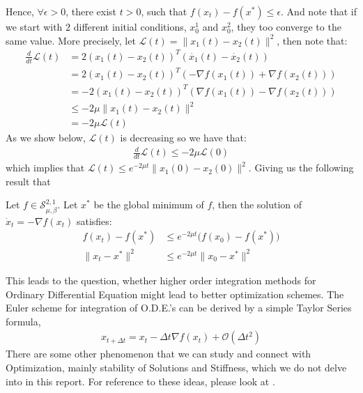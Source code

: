 Hence, $\forall \epsilon >0$, there exist $t>0$, such that $f(x_t) - f(x^*) \leq \epsilon$. And note that if we start with $2$ different initial conditions, $x_0^1$ and $x_0^2$, they too converge to the same value. More precisely, let $\mathcal{L}(t)= \| x_1 (t) - x_2 (t) \|^2$, then note that:
\begin{equation}
\begin{aligned}
\frac{d}{dt}\mathcal{L}(t) &= 2 (x_1(t) - x_2(t))^T (\dot{x_1}(t) - \dot{x_2}(t)) \\
&= 2 (x_1(t) - x_2(t))^T (-\nabla f(x_1(t)) + \nabla f(x_2(t))) \\
& = - 2 (x_1(t) - x_2(t))^T (\nabla f(x_1(t)) - \nabla f(x_2(t))) \\
& \leq - 2 \mu \| x_1(t) - x_2(t) \|^2 \\
&= -2 \mu \mathcal{L}(t)
\end{aligned}
\end{equation}
As we show below, $\mathcal{L}(t)$ is decreasing so we have that:
\begin{equation}
\begin{aligned}
\frac{d}{dt}\mathcal{L}(t) \leq - 2 \mu \mathcal{L}(0)
\end{aligned}
\end{equation}
which implies that $\mathcal{L}(t) \leq e^{-2 \mu t} \| x_1(0) - x_2(0) \|^2$. Giving us the following result that
\begin{prop}
Let $f \in \mathcal{S}_{\mu, \beta}^{2,1}$. Let $x^*$ be the global minimum of $f$, then the solution of $\dot{x}_t = -\nabla f(x_t)$ satisfies:
\begin{align*}
f(x_t) - f(x^*) &\leq e^{-2 \mu t} \big( f(x_0) - f(x^*) \big) \\
\| x_t - x^* \|^2 &\leq e^{-2 \mu t} \| x_0 - x^* \|^2
\end{align*}
\end{prop}

This leads to the question, whether higher order integration methods for Ordinary Differential Equation might lead to better optimization schemes. The Euler scheme for integration of O.D.E.'s can be derived by a simple Taylor Series formula,
\begin{align*}
x_{t+ \Delta t} = x_t - \Delta t \nabla f(x_{t}) + \mathcal{O}(\Delta t^2)
\end{align*}
There are some other phenomenon that we can study and connect with Optimization, mainly stability of Solutions and Stiffness, which we do not delve into in this report. For reference to these ideas, please look at \cite{alex2017}.


